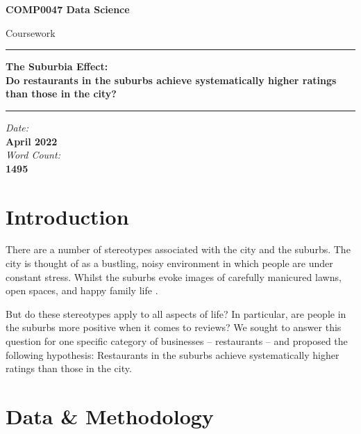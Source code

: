 \documentclass{article}
\newcommand{\HorRule}{\color{Black}\rule{14cm}{1pt}} %
\begin{document}

\begin{titlepage}
   \begin{center}
        \vspace*{2cm}
        \LARGE
        \textbf{COMP0047 Data Science}

        \Large
        Coursework
    
        \HorRule\vspace{3.5cm}
        {\selectfont
        \textbf{The Suburbia Effect: \\}
        \vspace{0.25cm}
        \textbf{Do restaurants in the suburbs achieve systematically higher ratings than those in the city?}}

        \large
        \vspace{4cm}
        \HorRule
        \vspace{1cm}
        \textit{Date:\\} \textbf{April 2022} \\
        \vspace{0.45cm}
        \textit{Word Count:\\} \textbf{1495} \\ \text{(\LaTeX)}
            
   \end{center}
\end{titlepage}


\section{Introduction}
There are a number of stereotypes associated with the city and the suburbs. The city is thought of as a bustling, noisy environment in which people are under constant stress. Whilst the suburbs evoke images of carefully manicured lawns, open spaces, and happy family life \cite{adams1992happiness}. \par

But do these stereotypes apply to all aspects of life? In particular, are people in the suburbs more positive when it comes to reviews? We sought to answer this question for one specific category of businesses – restaurants – and proposed the following hypothesis: Restaurants in the suburbs achieve systematically higher ratings than those in the city. 


\section{Data \& Methodology}
\end{document}
